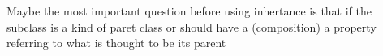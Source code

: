 Maybe the most important question before using inhertance is that if the subclass is a kind of paret class or should have a (composition) a property referring to what is thought to be its parent\cite{me}

